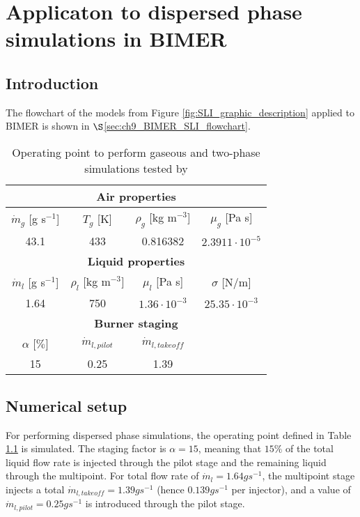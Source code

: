 \chapter{Applicaton to dispersed phase simulations in BIMER}
	\label{ch9:BIMER_lagrangian}

\section{Introduction}

The flowchart of the models from Figure \ref{fig:SLI_graphic_description} applied to BIMER is shown in $\S$\ref{sec:ch9_BIMER_SLI_flowchart}.

\begin{table}[!h]
\centering
\caption{Operating point to perform gaseous and two-phase simulations tested by }
\begin{tabular}{|c|c|c|c|}
\hline
\multicolumn{4}{|c|}{\textbf{Air properties}} \\
\hline
$\dot{m}_g$ [g s$^{-1}$] & $T_g$ [K] & $\rho_g$ [kg m$^{-3}$]  & $\mu_g$ [Pa s]  \\
\hline
43.1 & 433 & 0.816382 & $2.3911 \cdot 10^{-5}$ \\
\hline
\hline
\multicolumn{4}{|c|}{\textbf{Liquid properties}} \\
\hline
$\dot{m}_l$ [g s$^{-1}$] & $\rho_l$ [kg m$^{-3}]$   & $\mu_l$ [Pa s]   & $\sigma$ [N/m]   \\
\hline
1.64 & 750 & $1.36 \cdot 10^{-3}$ & $25.35 \cdot 10^{-3}$ \\
\hline
\hline
\multicolumn{4}{|c|}{\textbf{Burner staging}} \\
\hline
$\alpha$ [$\%$] & $\dot{m}_{l,pilot}$ & $\dot{m}_{l,takeoff}$ & \\
\hline
15 & 0.25 & 1.39 & \\
\hline
\end{tabular}
\label{tab:liquid_operating_point_Renaud}
\end{table}




\section{Numerical setup}

For performing dispersed phase simulations, the operating point defined in Table \ref{tab:liquid_operating_point_Renaud} is simulated. The staging factor is $\alpha = 15$, meaning that $15 \%$ of the total liquid flow rate is injected through the pilot stage and the remaining liquid through the multipoint. For total flow rate of $\dot{m}_l = 1.64 g s^{-1}$, the multipoint stage injects a total $\dot{m}_{l,takeoff} = 1.39 g s^{-1}$ (hence $0.139 g s^{-1}$ per injector), and a value of $\dot{m}_{l,pilot} = 0.25 g s^{-1}$ is introduced through the pilot stage.

